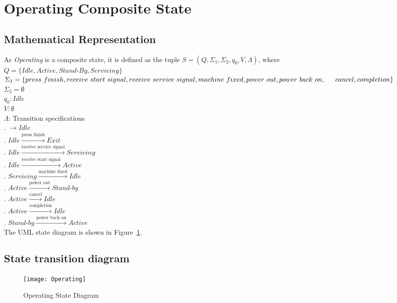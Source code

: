 \newpage
\section{Operating Composite State}

\subsection{Mathematical Representation}

\noindent As \textit{Operating} is a composite state, it is defined as the tuple $S = (Q, \Sigma_1, \Sigma_2, q_0, V, \Lambda)$, where\\

\noindent $Q = \{Idle, Active, \textit{Stand-By}, Servicing\}$\\
\noindent $\Sigma_1 = \{press~finish, receive~start~signal, receive~service~signal, machine~fixed, power~out, power~back~on, \\
\indent cancel, completion\}$\\
\noindent $\Sigma_2 = \emptyset$\\
\noindent $q_0: Idle$\\
\noindent $V: \emptyset$\\
\noindent $\Lambda$: Transition specifications\\
. $\rightarrow Idle$\\
. $Idle \xrightarrow {\text {press finish}} Exit$\\
. $Idle \xrightarrow {\text {receive service signal}} Servicing$\\
. $Idle \xrightarrow {\text {receive start signal}} Active$\\
. $Servicing \xrightarrow {\text {machine fixed}} Idle$\\
. $Active \xrightarrow {\text {power out}} \textit{Stand-by}$\\
. $Active \xrightarrow {\text {cancel}} Idle$\\
. $Active \xrightarrow {\text {completion}} Idle$\\
. $\textit{Stand-by} \xrightarrow {\text {power back on}} Active$\\

\noindent The UML state diagram is shown in Figure~\ref{fig:operating}.

\newpage

\subsection{State transition diagram}

\begin{figure}[h!]
	\centering
		\texttt{[image: Operating]}
		  \caption{Operating State Diagram}
  \label{fig:operating}
\end{figure}
